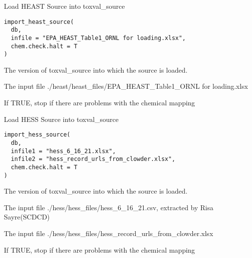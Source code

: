 \documentclass[letterpaper]{book}
\begin{document}
%
\begin{Description}\relax
Load HEAST Source into toxval\_source
\end{Description}
%
\begin{Usage}
\begin{verbatim}
import_heast_source(
  db,
  infile = "EPA_HEAST_Table1_ORNL for loading.xlsx",
  chem.check.halt = T
)
\end{verbatim}
\end{Usage}
%
\begin{Arguments}
\begin{ldescription}
\item[\code{db}] The version of toxval\_source into which the source is loaded.

\item[\code{infile}] The input file ./heast/heast\_files/EPA\_HEAST\_Table1\_ORNL for loading.xlsx

\item[\code{chem.check.halt}] If TRUE, stop if there are problems with the chemical mapping
\end{ldescription}
\end{Arguments}
%
\begin{Description}\relax
Load HESS Source into toxval\_source
\end{Description}
%
\begin{Usage}
\begin{verbatim}
import_hess_source(
  db,
  infile1 = "hess_6_16_21.xlsx",
  infile2 = "hess_record_urls_from_clowder.xlsx",
  chem.check.halt = T
)
\end{verbatim}
\end{Usage}
%
\begin{Arguments}
\begin{ldescription}
\item[\code{db}] The version of toxval\_source into which the source is loaded.

\item[\code{infile1}] The input file ./hess/hess\_files/hess\_6\_16\_21.csv, extracted by Risa Sayre(SCDCD)

\item[\code{infile2}] The input file ./hess/hess\_files/hess\_record\_urls\_from\_clowder.xlsx

\item[\code{chem.check.halt}] If TRUE, stop if there are problems with the chemical mapping
\end{ldescription}
\end{Arguments}
\end{document}
